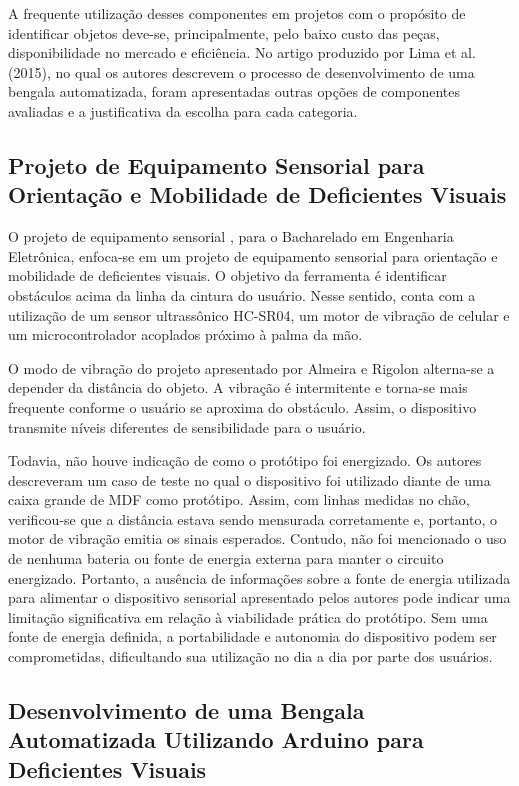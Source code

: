 A frequente utilização desses componentes em projetos com o propósito de identificar objetos deve-se, principalmente, pelo baixo custo das peças, disponibilidade no mercado e eficiência. No artigo produzido por Lima et al. (2015), no qual os autores descrevem o processo de desenvolvimento de uma bengala automatizada, foram apresentadas outras opções de componentes avaliadas e a justificativa da escolha para cada categoria. 

    \subsection{Projeto de Equipamento Sensorial para Orientação e Mobilidade de Deficientes Visuais}\label{sec:citacoes}
    
        O projeto de equipamento sensorial \cite{Rigolon}, para o Bacharelado em Engenharia Eletrônica, enfoca-se em um projeto de equipamento sensorial para orientação e mobilidade de deficientes visuais. O objetivo da ferramenta é identificar obstáculos acima da linha da cintura do usuário. Nesse sentido, conta com a utilização de um sensor ultrassônico HC-SR04, um motor de vibração de celular e um microcontrolador acoplados próximo à palma da mão.
    
        O modo de vibração do projeto apresentado por Almeira e Rigolon alterna-se a depender da distância do objeto. A vibração é intermitente e torna-se mais frequente conforme o usuário se aproxima do obstáculo. Assim, o dispositivo transmite níveis diferentes de sensibilidade para o usuário.
    
        Todavia, não houve indicação de como o protótipo foi energizado. Os autores descreveram um caso de teste no qual o dispositivo foi utilizado diante de uma caixa grande de MDF como protótipo. Assim, com linhas medidas no chão, verificou-se que a distância estava sendo mensurada corretamente e, portanto, o motor de vibração emitia os sinais esperados. Contudo, não foi mencionado o uso de nenhuma bateria ou fonte de energia externa para manter o circuito energizado. Portanto, a ausência de informações sobre a fonte de energia utilizada para alimentar o dispositivo sensorial apresentado pelos autores pode indicar uma limitação significativa em relação à viabilidade prática do protótipo. Sem uma fonte de energia definida, a portabilidade e autonomia do dispositivo podem ser comprometidas, dificultando sua utilização no dia a dia por parte dos usuários.
    
    \subsection{Desenvolvimento de uma Bengala Automatizada Utilizando Arduino para Deficientes Visuais}

